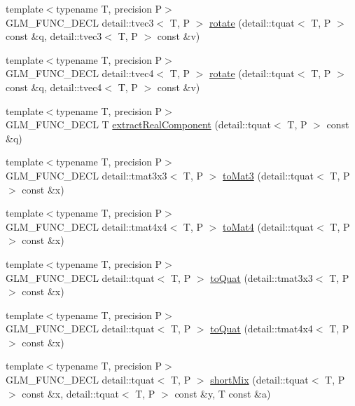 \begin{CompactItemize}
\item 
{\footnotesize template$<$typename T, precision P$>$ }\\GLM\_\-FUNC\_\-DECL detail::tvec3$<$ T, P $>$ \hyperlink{group__gtx__quaternion_g3b9f985e75b852e9526d5c088a50c3d4}{rotate} (detail::tquat$<$ T, P $>$ const \&q, detail::tvec3$<$ T, P $>$ const \&v)
\item 
{\footnotesize template$<$typename T, precision P$>$ }\\GLM\_\-FUNC\_\-DECL detail::tvec4$<$ T, P $>$ \hyperlink{group__gtx__quaternion_g9fd82cf89bc167ca12752f03a99329a4}{rotate} (detail::tquat$<$ T, P $>$ const \&q, detail::tvec4$<$ T, P $>$ const \&v)
\item 
{\footnotesize template$<$typename T, precision P$>$ }\\GLM\_\-FUNC\_\-DECL T \hyperlink{group__gtx__quaternion_g1185beb6d3dd4bcf64ea30f5f12a7368}{extractRealComponent} (detail::tquat$<$ T, P $>$ const \&q)
\item 
{\footnotesize template$<$typename T, precision P$>$ }\\GLM\_\-FUNC\_\-DECL detail::tmat3x3$<$ T, P $>$ \hyperlink{group__gtx__quaternion_gdff49fcff8a70186d2fe32117cb565e0}{toMat3} (detail::tquat$<$ T, P $>$ const \&x)
\item 
{\footnotesize template$<$typename T, precision P$>$ }\\GLM\_\-FUNC\_\-DECL detail::tmat4x4$<$ T, P $>$ \hyperlink{group__gtx__quaternion_g79cbd9f8eecf24a7b9f23e4de5fcec29}{toMat4} (detail::tquat$<$ T, P $>$ const \&x)
\item 
{\footnotesize template$<$typename T, precision P$>$ }\\GLM\_\-FUNC\_\-DECL detail::tquat$<$ T, P $>$ \hyperlink{group__gtx__quaternion_gdc8d8daae2f8d725dae576d6655e36d2}{toQuat} (detail::tmat3x3$<$ T, P $>$ const \&x)
\item 
{\footnotesize template$<$typename T, precision P$>$ }\\GLM\_\-FUNC\_\-DECL detail::tquat$<$ T, P $>$ \hyperlink{group__gtx__quaternion_g1d496c7c0d0b1a2edc5bb4c2ffcbc6e7}{toQuat} (detail::tmat4x4$<$ T, P $>$ const \&x)
\item 
{\footnotesize template$<$typename T, precision P$>$ }\\GLM\_\-FUNC\_\-DECL detail::tquat$<$ T, P $>$ \hyperlink{group__gtx__quaternion_g1d83d29dc8f5870d70d2833c64be777c}{shortMix} (detail::tquat$<$ T, P $>$ const \&x, detail::tquat$<$ T, P $>$ const \&y, T const \&a)
\item 

\end{CompactItemize}
